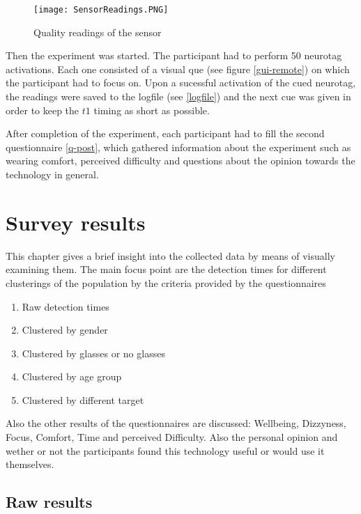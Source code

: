             \begin{figure}[h]     %
                \centering
                \texttt{[image: SensorReadings.PNG]} 
                \caption{Quality readings of the sensor}\label{electrode-quality}
            \end{figure}

            Then the experiment was started. The participant had to perform 50 neurotag activations. Each one consisted of a visual que (see figure \ref*{gui-remote}) on which the participant had to focus on. Upon a sucessful activation of the cued neurotag, the readings were saved to the logfile (see \ref*{logfile}) and the next cue was given in order to keep the $t1$ timing as short as possible.

            After completion of the experiment, each participant had to fill the second questionnaire \ref*{q-post}, which gathered information about the experiment such as wearing comfort, perceived difficulty and questions about the opinion towards the technology in general. 

    \chapter{Survey results}\label{raw-results}

        This chapter gives a brief insight into the collected data by means of visually examining them. The main focus point are the detection times for different clusterings of the population by the criteria provided by the questionnaires

        \begin{enumerate}
            \item Raw detection times
            \item Clustered by gender
            \item Clustered by glasses or no glasses
            \item Clustered by age group
            \item Clustered by different target
        \end{enumerate}

        Also the other results of the questionnaires are discussed: Wellbeing, Dizzyness, Focus, Comfort, Time and perceived Difficulty. Also the personal opinion and wether or not the participants found this technology useful or would use it themselves.

        \section{Raw results}

